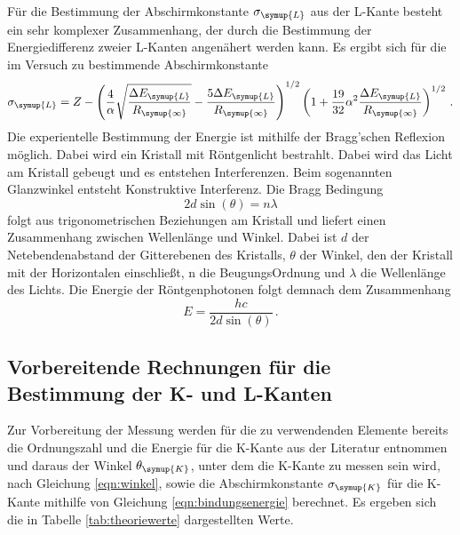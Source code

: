 Für die Bestimmung der Abschirmkonstante $\sigma_{\symup{L}}$ aus der L-Kante besteht ein
sehr komplexer Zusammenhang, der durch die Bestimmung der Energiedifferenz zweier
L-Kanten angenähert werden kann. Es ergibt sich für die im Versuch zu bestimmende
Abschirmkonstante
\begin{equation}
  \sigma_{\symup{L}}=Z-\left(\frac{4}{\alpha} \sqrt{\frac{\Delta E_{\symup{L}}}{R_{\symup{\infty}}}}
  -\frac{5\Delta E_{\symup{L}}}{R_{\symup{\infty}}}\right)^{1/2}
  \left(1+\frac{19}{32}\alpha^2 \frac{\Delta E_{\symup{L}}}{R_{\symup{\infty}}}\right)^{1/2} \,.
  \label{eqn:naeherung}
\end{equation}
Die experientelle Bestimmung der Energie ist mithilfe der Bragg'schen Reflexion
möglich. Dabei wird ein Kristall mit Röntgenlicht bestrahlt. Dabei wird das Licht
am Kristall gebeugt und es entstehen Interferenzen. Beim sogenannten Glanzwinkel
entsteht Konstruktive Interferenz. Die Bragg Bedingung
\begin{equation}
  2 d \sin(\theta)= n \lambda
  \label{eqn:bragg}
\end{equation}
folgt aus trigonometrischen Beziehungen am Kristall und liefert einen Zusammenhang
zwischen Wellenlänge und Winkel. Dabei ist $d$ der Netebendenabstand der Gitterebenen
des Kristalls, $\theta$ der Winkel, den der Kristall mit der Horizontalen einschließt,
n die BeugungsOrdnung und $\lambda$ die Wellenlänge des Lichts.  Die Energie der
Röntgenphotonen folgt demnach dem Zusammenhang
\begin{equation}
  E=\frac{h c}{2 d \sin(\theta)} \,.
  \label{eqn:winkel}
\end{equation}


\subsection{Vorbereitende Rechnungen für die Bestimmung der K- und L-Kanten}
\label{sec:K_L_Kanten}

Zur Vorbereitung der Messung werden für die zu verwendenden Elemente bereits
die Ordnungszahl und die Energie für die K-Kante aus der Literatur entnommen und
daraus der Winkel $\theta_{\symup{K}}$, unter dem die K-Kante zu messen sein wird,
nach Gleichung \eqref{eqn:winkel}, sowie die Abschirmkonstante $\sigma_{\symup{K}}$
für die K-Kante mithilfe von Gleichung \eqref{eqn:bindungsenergie} berechnet.
Es ergeben sich die in Tabelle \ref{tab:theoriewerte} dargestellten Werte.

